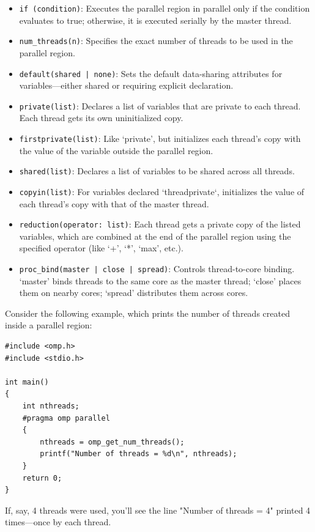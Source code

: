 \documentclass[12pt]{book}
\begin{document}
\begin{itemize}
    \item \texttt{if (condition)}: Executes the parallel region in parallel only if the condition evaluates to true; otherwise, it is executed serially by the master thread.
    \item \texttt{num\_threads(n)}: Specifies the exact number of threads to be used in the parallel region.
    \item \texttt{default(shared | none)}: Sets the default data-sharing attributes for variables—either shared or requiring explicit declaration.
    \item \texttt{private(list)}: Declares a list of variables that are private to each thread. Each thread gets its own uninitialized copy.
    \item \texttt{firstprivate(list)}: Like `private', but initializes each thread’s copy with the value of the variable outside the parallel region.
    \item \texttt{shared(list)}: Declares a list of variables to be shared across all threads.
    \item \texttt{copyin(list)}: For variables declared `threadprivate`, initializes the value of each thread’s copy with that of the master thread.
    \item \texttt{reduction(operator: list)}: Each thread gets a private copy of the listed variables, which are combined at the end of the parallel region using the specified operator (like `+', `*', `max', etc.).
    \item \texttt{proc\_bind(master | close | spread)}: Controls thread-to-core binding. `master' binds threads to the same core as the master thread; `close' places them on nearby cores; `spread' distributes them across cores.
\end{itemize}

\vspace{0.5em}
\noindent
Consider the following example, which prints the number of threads created inside a parallel region:

\begin{lstlisting}[style=cppstyle]
#include <omp.h>
#include <stdio.h>

int main()
{
    int nthreads;
    #pragma omp parallel
    {
        nthreads = omp_get_num_threads();
        printf("Number of threads = %d\n", nthreads);
    }
    return 0;
}
\end{lstlisting}

If, say, 4 threads were used, you’ll see the line "Number of threads = 4" printed 4 times—once by each thread.
\end{document}
